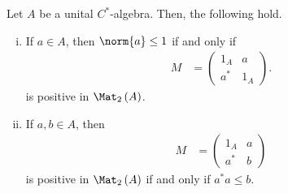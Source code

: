 \begin{lemma}\label{lemma:positive_elements_from_matrix_algebras}
  Let $A$ be a unital $C^{\ast}$-algebra. Then, the following hold.
  \begin{enumerate}[(i)]
    \item If $a\in A$, then $\norm{a}\leq 1$ if and only if
      \begin{align*}
        M &= \begin{pmatrix}1_A & a\\a^{\ast} & 1_A\end{pmatrix}.
      \end{align*}
      is positive in $\Mat_2\left( A \right)$.
    \item If $a,b\in A$, then 
      \begin{align*}
        M &= \begin{pmatrix}1_A & a \\ a^{\ast} & b\end{pmatrix}
      \end{align*}
      is positive in $\Mat_2\left( A \right)$ if and only if $a^{\ast}a \leq b$.
  \end{enumerate}
\end{lemma}
